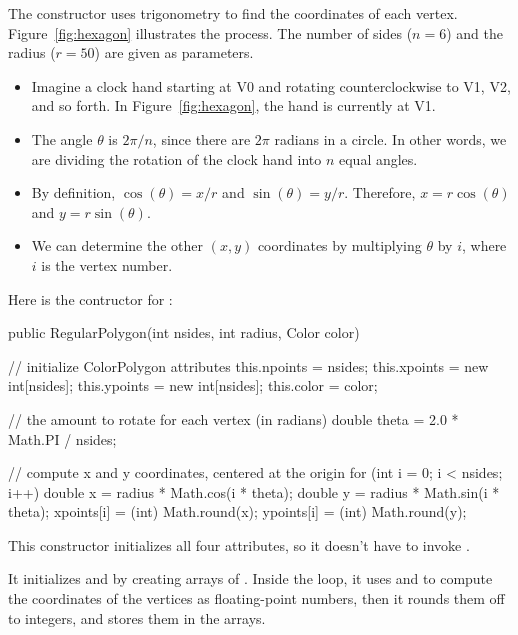 The constructor uses trigonometry to find the coordinates of each vertex.
Figure~\ref{fig:hexagon} illustrates the process.
The number of sides ($n=6$) and the radius ($r=50$) are given as parameters.

\begin{itemize}

\item Imagine a clock hand starting at V0 and rotating counterclockwise to V1, V2, and so forth.
In Figure~\ref{fig:hexagon}, the hand is currently at V1.

\item The angle $\theta$ is $2 \pi / n$, since there are $2\pi$ radians in a circle.
In other words, we are dividing the rotation of the clock hand into $n$ equal angles.

\item By definition, $\cos(\theta) = x/r$ and $\sin(\theta) = y/r$. Therefore, $x = r \cos(\theta)$ and $y = r \sin(\theta)$.

\item We can determine the other $(x, y)$ coordinates by multiplying $\theta$ by $i$, where $i$ is the vertex number.

\end{itemize}

Here is the contructor for :

\begin{code}
public RegularPolygon(int nsides, int radius, Color color) {

    // initialize ColorPolygon attributes
    this.npoints = nsides;
    this.xpoints = new int[nsides];
    this.ypoints = new int[nsides];
    this.color = color;

    // the amount to rotate for each vertex (in radians)
    double theta = 2.0 * Math.PI / nsides;

    // compute x and y coordinates, centered at the origin
    for (int i = 0; i < nsides; i++) {
        double x = radius * Math.cos(i * theta);
        double y = radius * Math.sin(i * theta);
        xpoints[i] = (int) Math.round(x);
        ypoints[i] = (int) Math.round(y);
    }
}
\end{code}

This constructor initializes all four attributes, so it doesn't have to invoke .

It initializes  and  by creating arrays of .
Inside the  loop, it uses  and  to compute the coordinates of the vertices as floating-point numbers, then it rounds them off to integers, and stores them in the arrays.

